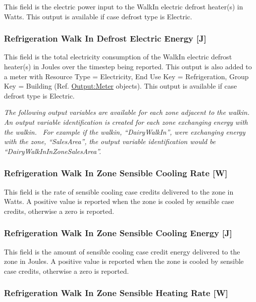 This field is the electric power input to the WalkIn electric defrost heater(s) in Watts. This output is available if case defrost type is Electric.

\subsubsection{Refrigeration Walk In Defrost Electric Energy {[}J{]}}\label{refrigeration-walk-in-defrost-electric-energy-j}

This field is the total electricity consumption of the WalkIn electric defrost heater(s) in Joules over the timestep being reported. This output is also added to a meter with Resource Type = Electricity, End Use Key = Refrigeration, Group Key = Building (Ref. \hyperref[outputmeter-and-outputmetermeterfileonly]{Output:Meter} objects). This output is available if case defrost type is Electric.

\emph{The following output variables are available for each zone adjacent to the walkin. An output variable identification is created for each zone exchanging energy with the walkin.~ For example if the walkin, ``DairyWalkIn'', were exchanging energy with the zone, ``SalesArea'', the output variable identification would be ``DairyWalkInInZoneSalesArea''.}

\subsubsection{Refrigeration Walk In Zone Sensible Cooling Rate {[}W{]}}\label{refrigeration-walk-in-zone-sensible-cooling-rate-w}

This field is the rate of sensible cooling case credits delivered to the zone in Watts. A positive value is reported when the zone is cooled by sensible case credits, otherwise a zero is reported.

\subsubsection{Refrigeration Walk In Zone Sensible Cooling Energy {[}J{]}}\label{refrigeration-walk-in-zone-sensible-cooling-energy-j}

This field is the amount of sensible cooling case credit energy delivered to the zone in Joules. A positive value is reported when the zone is cooled by sensible case credits, otherwise a zero is reported.

\subsubsection{Refrigeration Walk In Zone Sensible Heating Rate {[}W{]}}\label{refrigeration-walk-in-zone-sensible-heating-rate-w}

